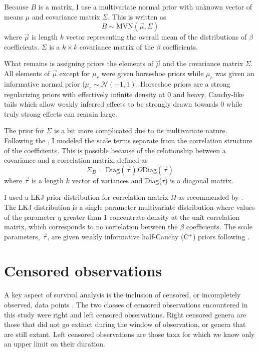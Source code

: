 \documentclass[12pt,letterpaper]{article}
\begin{document}
Because \(B\) is a matrix, I use a multivariate normal prior with unknown vector of means \(\mu\) and covariance matrix \(\Sigma\). This is written as 
\begin{equation}
  B \sim \mathrm{MVN}(\vec{\mu}, \Sigma)
  \label{eq:beta_prior}
\end{equation}
where \(\vec{\mu}\) is length \(k\) vector representing the overall mean of the distributions of \(\beta\) coefficients. \(\Sigma\) is a \(k \times k\) covariance matrix of the \(\beta\) coefficients.

What remains is assigning priors the elements of \(\vec{\mu}\) and the covariance matrix \(\Sigma\). All elements of \(\vec{\mu}\) except for \(\mu_{r}\) were given horseshoe priors \citep{Carvalho2010,Carvalho2009} while \(\mu_{r}\) was given an informative normal prior (\(\mu_{r} \sim \mathcal{N}(-1, 1)\). Horseshoe priors are a strong regularizing priors with effectively infinite density at 0 and heavy, Cauchy-like tails \citep{Carvalho2010,Carvalho2009} which allow weakly inferred effects to be strongly drawn towards 0 while truly strong effects can remain large. 

The prior for \(\Sigma\) is a bit more complicated due to its multivariate nature. Following the \citet{stan-manual:2014}, I modeled the scale terms separate from the correlation structure of the coefficients. This is possible because of the relationship between a covariance and a correlation matrix, defined as 
\begin{equation}
  \Sigma_{B} = \text{Diag}(\vec{\tau}) \Omega \text{Diag}(\vec{\tau})
  \label{eq:covcor}
\end{equation}
where \(\vec{\tau}\) is a length \(k\) vector of variances and Diag(\(\tau\)) is a diagonal matrix.

I used a LKJ prior distribution for correlation matrix \(\Omega\) as recommended by \citet{stan-manual:2014}. The LKJ distribution is a single parameter multivariate distribution where values of the parameter \(\eta\) greater than 1 concentrate density at the unit correlation matrix, which corresponds to no correlation between the \(\beta\) coefficients. The scale parameters, \(\vec{\tau}\), are given weakly informative half-Cauchy (C\(^{+}\)) priors following \citet{Gelman2006a}.



\section{Censored observations} \label{sec:cen}
A key aspect of survival analysis is the inclusion of censored, or incompletely observed, data points \citep{Ibrahim2001,Klein2003}. The two classes of censored observations encountered in this study were right and left censored observations. Right censored genera are those that did not go extinct during the window of observation, or genera that are still extant. Left censored observations are those taxa for which we know only an upper limit on their duration.
\end{document}
